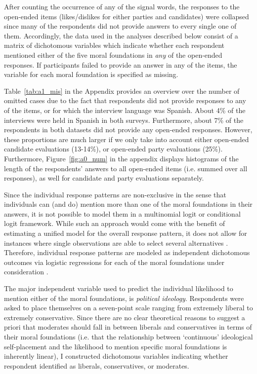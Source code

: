 \documentclass[12pt]{paper}
\begin{document}
After counting the occurrence of any of the signal words, the responses to the open-ended items (likes/dislikes for either parties and candidates) were collapsed since many of the respondents did not provide answers to every single one of them. Accordingly, the data used in the analyses described below consist of a matrix of dichotomous variables which indicate whether each respondent mentioned either of the five moral foundations in \textit{any} of the open-ended responses. If participants failed to provide an answer in any of the items, the variable for each moral foundation is specified as missing.

Table~\ref{tab:a1_mis} in the Appendix provides an overview over the number of omitted cases due to the fact that respondents did not provide responses to any of the items, or for which the interview language was Spanish. About 4\% of the interviews were held in Spanish in both surveys. Furthermore, about 7\% of the respondents in both datasets did not provide any open-ended responses. However, these proportions are much larger if we only take into account either open-ended candidate evaluations (13-14\%), or open-ended party evaluations (25\%). Furthermore, Figure~\ref{fig:a0_num} in the appendix displays histograms of the length of the respondents' answers to all open-ended items (i.e. summed over all responses), as well for candidate and party evaluations separately.

Since the individual response patterns are non-exclusive in the sense that individuals can (and do) mention more than one of the moral foundations in their answers, it is not possible to model them in a multinomial logit or conditional logit framework. While such an approach would come with the benefit of estimating a unified model for the overall response pattern, it does not allow for instances where single observations are able to select several alternatives \citep[but see][]{gilbert2007models}. Therefore, individual response patterns are modeled as independent dichotomous outcomes via logistic regressions for each of the moral foundations under consideration \citep[c.f. for example][]{agresti1999modeling}.

The major independent variable used to predict the individual likelihood to mention either of the moral foundations, is \textit{political ideology}. Respondents were asked to place themselves on a seven-point scale ranging from extremely liberal to extremely conservative. Since there are no clear theoretical reasons to suggest a priori that moderates should fall in between liberals and conservatives in terms of their moral foundations (i.e. that the relationship between `continuous' ideological self-placement and the likelihood to mention specific moral foundations is inherently linear), I constructed dichotomous variables indicating whether respondent identified as liberals, conservatives, or moderates.
\end{document}

